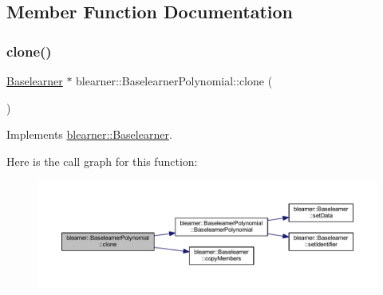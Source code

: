 \subsection{Member Function Documentation}
\mbox{\label{classblearner_1_1_baselearner_polynomial_a4afd811448bd6d387b721cc48b84da26}} 
\subsubsection{\texorpdfstring{clone()}{clone()}}
{\footnotesize\ttfamily \mbox{\hyperlink{classblearner_1_1_baselearner}{Baselearner}} $\ast$ blearner\+::\+Baselearner\+Polynomial\+::clone (\begin{DoxyParamCaption}{ }\end{DoxyParamCaption})\hspace{0.3cm}{\ttfamily [virtual]}}



Implements \mbox{\hyperlink{classblearner_1_1_baselearner_a8e12c6739f085917a7d2da6570c51a21}{blearner\+::\+Baselearner}}.

Here is the call graph for this function\+:
\nopagebreak
\begin{figure}[H]
\begin{center}
\leavevmode
\includegraphics[width=350pt]{classblearner_1_1_baselearner_polynomial_a4afd811448bd6d387b721cc48b84da26_cgraph}
\end{center}
\end{figure}
\mbox{\label{classblearner_1_1_baselearner_polynomial_aacd6ba3b09ccf63a96d7bffa1d703710}} 
